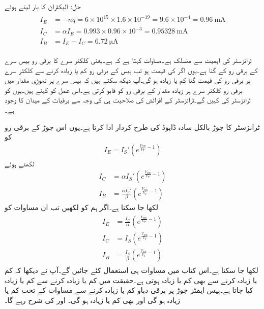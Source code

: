 حل:
	الیکٹران کا بار  لیتے ہوئے
\begin{gather}
\begin{aligned}
I_E&=-nq=6 \times 10^{15} \times 1.6 \times 10^{-19}=9.6 \times 10^{-4}=\SI{0.96}{\milli \ampere}\\
I_C&=\alpha I_E = 0.993 \times 0.96 \times 10^{-3}=\SI{0.95328}{\milli \ampere}\\
I_B&=I_E-I_C=\SI{6.72}{\micro \ampere}
\end{aligned}
\end{gather}

ٹرانزسٹر کی اہمیت  سے منسلک ہے۔مساوات   کہتا ہے کہ   ہے۔یعنی کلکٹر  سرے کا برقی رو بیس سرے کے برقی رو کے  گنا ہے۔یوں اگر  کی قیمت  ہو تب بیس کے برقی رو کم یا زیادہ کرنے سے کلکٹر  سرے پر برقی رو کی قیمت  گنا کم یا زیادہ ہو گی۔آپ دیکھ سکتے ہیں کہ بیس سرے پر تھوڑی مقدار میں برقی رو کلکٹر  سرے پر زیادہ مقدار کے برقی رو کو قابو کرتی ہے۔اس عمل کو   کہتے ہیں۔یوں  کو ٹرانزسٹر کی   کہیں گے۔ٹرانزسٹر کے افزائش کی صلاحیت ہی کی وجہ سے برقیات کے میدان کا وجود ہے۔

ٹرانزسٹر کا  جوڑ بالکل سادہ ڈایوڈ کی طرح کردار ادا کرتا ہے۔یوں اس جوڑ کے برقی رو کو
\begin{align*}
I_E=I_S' \left(e^{\frac{V_{BE}}{V_T}-1} \right)
\end{align*}
لکھتے ہوئے 
\begin{align*}
I_C&=\alpha  I_S' \left(e^{\frac{V_{BE}}{V_T}-1} \right)\\
I_B&=\frac{\alpha I_S'}{\beta} \left(e^{\frac{V_{BE}}{V_T}-1} \right)
\end{align*}
لکھا جا سکتا ہے۔اگر ہم   کو  لکھیں تب ان مساوات کو
\begin{gather}
\begin{aligned}\label{مساوات_ٹرانزسٹر_بنیادی_ڈایوڈ-مساوات}
I_E&=\frac{I_C}{\alpha} \left(e^{\frac{V_{BE}}{V_T}-1} \right)\\
I_C &= I_S \left(e^{\frac{V_{BE}}{V_T}-1} \right)\\
I_B&=\frac{I_S}{\beta} \left(e^{\frac{V_{BE}}{V_T}-1} \right)
\end{aligned}
\end{gather}
لکھا جا سکتا ہے۔اس کتاب میں مساوات  ہی استعمال کئے جائیں گے۔آپ نے دیکھا کہ  کم یا زیادہ کرنے سے  بھی کم یا زیادہ ہوتی ہے۔حقیقت میں  کم یا زیادہ کرنے سے  کم یا زیادہ کیا جاتا ہے۔بیس-ایمٹر جوڑ پر برقی دباو  کم یا زیادہ کرنے سے   مساوات  کے تحت کم یا زیادہ  ہو گی اور  بھی کم یا زیادہ ہو گی۔ اور  کی شرح  رہے گا۔

